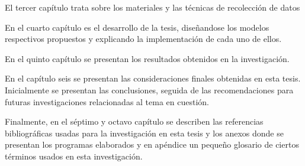 	El tercer capítulo trata sobre los materiales y las técnicas de recolección de datos

	En el cuarto capítulo es el desarrollo de la tesis, diseñandose los modelos respectivos propuestos y explicando la implementación de cada uno de ellos.
	
	En el quinto capítulo se presentan los resultados obtenidos en la investigación.

	En el capítulo seis se presentan las consideraciones finales obtenidas en esta tesis. Inicialmente se presentan las conclusiones, seguida de las recomendaciones para futuras investigaciones relacionadas al tema en cuestión.

	Finalmente, en el séptimo y octavo capítulo se describen las referencias bibliográficas usadas para la investigación en esta tesis y los anexos donde se presentan los programas elaborados y en apéndice un pequeño glosario de ciertos términos usados en esta investigación.



